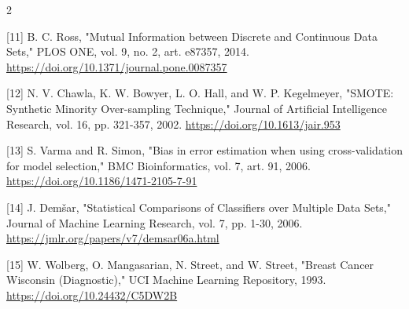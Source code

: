 \documentclass[10pt,a4paper]{article}
\begin{document}
\begin{multicols}{2}
\begin{minipage}{\linewidth}{\fontsize{7}{8.2}\selectfont \begin{latin}[11] B. C. Ross, "Mutual Information between Discrete and Continuous Data Sets," PLOS ONE, vol. 9, no. 2, art. e87357, 2014. \url{https://doi.org/10.1371/journal.pone.0087357}\end{latin}\par}\end{minipage}\par
\begin{minipage}{\linewidth}{\fontsize{7}{8.2}\selectfont \begin{latin}[12] N. V. Chawla, K. W. Bowyer, L. O. Hall, and W. P. Kegelmeyer, "SMOTE: Synthetic Minority Over-sampling Technique," Journal of Artificial Intelligence Research, vol. 16, pp. 321-357, 2002. \url{https://doi.org/10.1613/jair.953}\end{latin}\par}\end{minipage}\par
\begin{minipage}{\linewidth}{\fontsize{7}{8.2}\selectfont \begin{latin}[13] S. Varma and R. Simon, "Bias in error estimation when using cross-validation for model selection," BMC Bioinformatics, vol. 7, art. 91, 2006. \url{https://doi.org/10.1186/1471-2105-7-91}\end{latin}\par}\end{minipage}\par
\begin{minipage}{\linewidth}{\fontsize{7}{8.2}\selectfont \begin{latin}[14] J. Demšar, "Statistical Comparisons of Classifiers over Multiple Data Sets," Journal of Machine Learning Research, vol. 7, pp. 1-30, 2006. \url{https://jmlr.org/papers/v7/demsar06a.html}\end{latin}\par}\end{minipage}\par
\begin{minipage}{\linewidth}{\fontsize{7}{8.2}\selectfont \begin{latin}[15] W. Wolberg, O. Mangasarian, N. Street, and W. Street, "Breast Cancer Wisconsin (Diagnostic)," UCI Machine Learning Repository, 1993. \url{https://doi.org/10.24432/C5DW2B}\end{latin}\par}\end{minipage}\par
\end{multicols}
\end{document}
